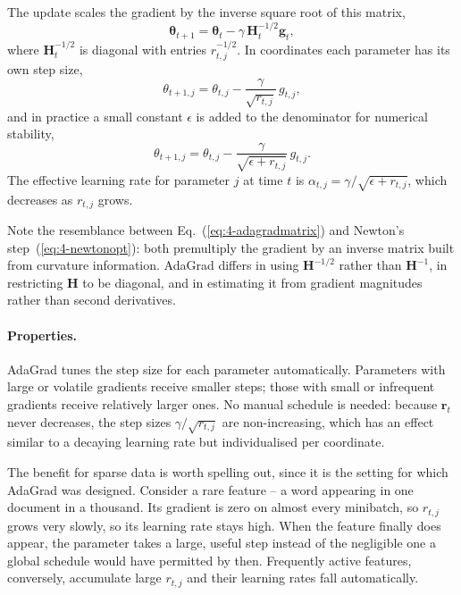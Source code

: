 The update scales the gradient by the inverse square root of this matrix,
\begin{equation}
  \bm{\theta}_{t+1} = \bm{\theta}_t - \gamma\,\bm{H}_t^{-1/2}\bm{g}_t,
  \label{eq:4-adagradmatrix}
\end{equation}
where $\bm{H}_t^{-1/2}$ is diagonal with entries $r_{t,j}^{-1/2}$.  In
coordinates each parameter has its own step size,
\begin{equation}
  \theta_{t+1,j} = \theta_{t,j} - \frac{\gamma}{\sqrt{r_{t,j}}}\,g_{t,j},
  \label{eq:4-adagradcoord}
\end{equation}
and in practice a small constant $\epsilon$ is added to the denominator for
numerical stability,
\begin{equation}
  \boxed{\;
  \theta_{t+1,j} = \theta_{t,j}
    - \frac{\gamma}{\sqrt{\epsilon + r_{t,j}}}\,g_{t,j} . \;}
  \label{eq:4-adagrad}
\end{equation}
The effective learning rate for parameter $j$ at time $t$ is
$\alpha_{t,j}=\gamma/\sqrt{\epsilon+r_{t,j}}$, which decreases as $r_{t,j}$
grows.

Note the resemblance between Eq.~(\ref{eq:4-adagradmatrix}) and Newton's
step~(\ref{eq:4-newtonopt}): both premultiply the gradient by an inverse
matrix built from curvature information.  AdaGrad differs in using
$\bm{H}^{-1/2}$ rather than $\bm{H}^{-1}$, in restricting $\bm{H}$ to be
diagonal, and in estimating it from gradient magnitudes rather than second
derivatives.

\paragraph{Properties.}
AdaGrad tunes the step size for each parameter automatically.  Parameters with
large or volatile gradients receive smaller steps; those with small or
infrequent gradients receive relatively larger ones.  No manual schedule is
needed: because $\bm{r}_t$ never decreases, the step sizes
$\gamma/\sqrt{r_{t,j}}$ are non-increasing, which has an effect similar to a
decaying learning rate but individualised per coordinate.

The benefit for sparse data is worth spelling out, since it is the setting for
which AdaGrad was designed.  Consider a rare feature -- a word appearing in
one document in a thousand.  Its gradient is zero on almost every minibatch,
so $r_{t,j}$ grows very slowly, so its learning rate stays high.  When the
feature finally does appear, the parameter takes a large, useful step instead
of the negligible one a global schedule would have permitted by then.
Frequently active features, conversely, accumulate large $r_{t,j}$ and their
learning rates fall automatically.

